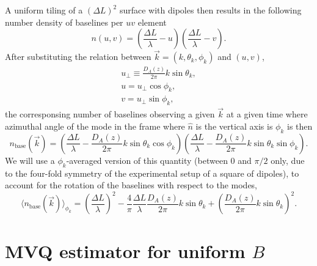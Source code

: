 \documentclass[12pt]{paper}
\newcommand{\beq}{\begin{equation}}
\newcommand{\eeq}{\end{equation}}
\newcommand{\bga}{\begin{gathered}}
\newcommand{\ega}{\end{gathered}}
\begin{document}
A uniform tiling of a $(\Delta L)^2$ surface with dipoles then results in the following number density of baselines per $uv$ element
\beq
n(u,v) = (\frac{\Delta L}{\lambda} - u)(\frac{\Delta L}{\lambda} - v).
\label{eq:nuv_fftt}
\eeq
After substituting the relation between $\vec k=(k,\theta_k,\phi_k)$ and $(u,v)$, 
\beq
\bga
u_\perp \equiv \frac{D_A(z)}{2\pi}k\sin\theta_k,\\
u = u_\perp \cos\phi_k,\\
v = u_\perp \sin\phi_k,
\ega
\label{eq:k_uv}
\eeq
the corresponsing number of baselines observing a given $\vec k$ at a given time where azimuthal angle of the mode in the frame where $\widehat n$ is the vertical axis is $\phi_k$ is then
\beq
n_\text{base}(\vec k) = (\frac{\Delta L}{\lambda} - \frac{D_A(z)}{2\pi}k\sin\theta_k\cos\phi_k)(\frac{\Delta L}{\lambda} - \frac{D_A(z)}{2\pi}k\sin\theta_k\sin\phi_k).
\label{eq:nk_fftt}
\eeq
We will use a $\phi_k$-averaged version of this quantity (between $0$ and $\pi/2$ only, due to the four-fold symmetry of the experimental setup of a square of dipoles), to account for the rotation of the baselines with respect to the modes,
\beq
\langle n_\text{base}(\vec k) \rangle_{\phi_k}= \left(\frac{\Delta L}{\lambda}\right)^2 -\frac{4}{\pi}\frac{\Delta L}{\lambda}\frac{D_A(z)}{2\pi}k\sin\theta_k + \left(\frac{D_A(z)}{2\pi}k\sin\theta_k\right)^2.
\label{eq:nk_fftt_mean}
\eeq
\section{MVQ estimator for uniform $ B$}
\label{sec:B_estimator}
\end{document}
